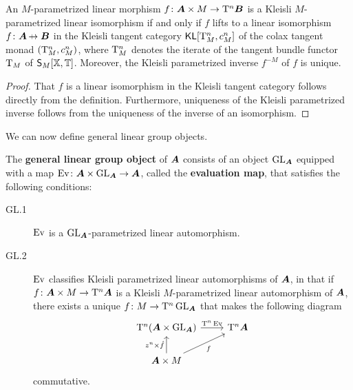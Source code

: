 \begin{lemma}
\label{lemma:kleisli-PLI}
An $M$-parametrized linear morphism $f\colon{\bm{A}}\times M\to\mathrm{T}^n{\bm{B}}$ is a Kleisli $M$-parametrized linear isomorphism if and only if $f$ lifts to a linear isomorphism $f\colon\A\nto\B$ in the Kleisli tangent category $\mathsf{KL}[\mathrm{T}_M^n,c^n_M]$ of the colax tangent monad $(\mathrm{T}_M^n,c_M^n)$, where $\mathrm{T}^n_M$ denotes the iterate of the tangent bundle functor $\mathrm{T}_M$ of $\mathsf{S}_M[\mathbb{X},\mathbb{T}]$. Moreover, the Kleisli parametrized inverse $f^{-M}$ of $f$ is unique.
\end{lemma}
\begin{proof}
That $f$ is a linear isomorphism in the Kleisli tangent category follows directly from the definition. Furthermore, uniqueness of the Kleisli parametrized inverse follows from the uniqueness of the inverse of an isomorphism.
\end{proof}

We can now define general linear group objects.

\begin{definition}
\label{definition:general-linear-group}
The \textbf{general linear group object} of ${\bm{A}}$ consists of an object $\operatorname{GL}_{\bm{A}}$ equipped with a map $\operatorname{Ev}\colon{\bm{A}}\times\operatorname{GL}_{\bm{A}}\to{\bm{A}}$, called the \textbf{evaluation map}, that satisfies the following conditions:
\begin{description}
\item[GL.1] $\operatorname{Ev}$ is a $\operatorname{GL}_{\bm{A}}$-parametrized linear automorphism.

\item[GL.2] $\operatorname{Ev}$ classifies Kleisli parametrized linear automorphisms of ${\bm{A}}$, in that if $f\colon{\bm{A}}\times M\to\mathrm{T}^n{\bm{A}}$ is a Kleisli $M$-parametrized linear automorphism of ${\bm{A}}$, there exists a unique $f\colon M\to\mathrm{T}^n\operatorname{GL}_{\bm{A}}$ that makes the following diagram
\begin{equation*}
\begin{tikzcd}
{\T^n(\A\times\GL_\A)} & {\T^n\A} \\
{\A\times M}
\arrow["{\T^n\Ev}", from=1-1, to=1-2]
\arrow["{z^n\times\hat f}", from=2-1, to=1-1]
\arrow["f"', from=2-1, to=1-2]
\end{tikzcd}
\end{equation*}
commutative.
\end{description}
\end{definition}

